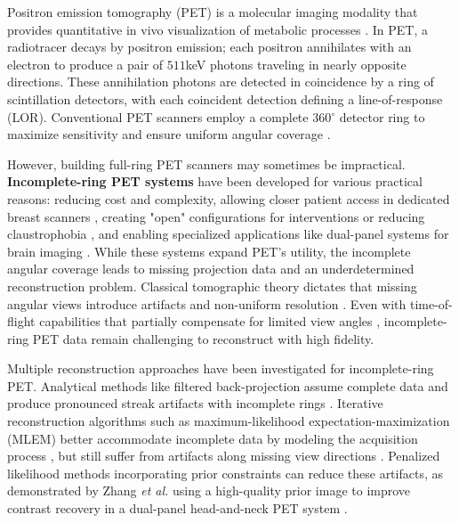 \documentclass[
reprint,
superscriptaddress,
nofootinbib,
amsmath,amssymb,
aps,
prd,
]{revtex4-2}
\begin{document}
Positron emission tomography (PET) is a molecular imaging modality that provides quantitative in vivo visualization of metabolic processes  \cite{townsend2004}. In PET, a radiotracer decays by positron emission; each positron annihilates with an electron to produce a pair of $511$keV photons traveling in nearly opposite directions. These annihilation photons are detected in coincidence by a ring of scintillation detectors, with each coincident detection defining a line-of-response (LOR). Conventional PET scanners employ a complete 360$^\circ$ detector ring to maximize sensitivity and ensure uniform angular coverage  \cite{townsend2004}.

However, building full-ring PET scanners may sometimes be impractical. \textbf{Incomplete-ring PET systems} have been developed for various practical reasons: reducing cost and complexity, allowing closer patient access in dedicated breast scanners  \cite{surti2008}, creating "open" configurations for interventions or reducing claustrophobia  \cite{tashima2012, krishnamoorthy2021}, and enabling specialized applications like dual-panel systems for brain imaging  \cite{zhang2020}. While these systems expand PET's utility, the incomplete angular coverage leads to missing projection data and an underdetermined reconstruction problem. Classical tomographic theory dictates that missing angular views introduce artifacts and non-uniform resolution  \cite{kak1988, surti2008}. Even with time-of-flight capabilities that partially compensate for limited view angles  \cite{surti2008, krishnamoorthy2021}, incomplete-ring PET data remain challenging to reconstruct with high fidelity.

Multiple reconstruction approaches have been investigated for incomplete-ring PET. Analytical methods like filtered back-projection assume complete data and produce pronounced streak artifacts with incomplete rings  \cite{kak1988}. Iterative reconstruction algorithms such as maximum-likelihood expectation-maximization (MLEM) better accommodate incomplete data by modeling the acquisition process  \cite{qi2006}, but still suffer from artifacts along missing view directions  \cite{zhang2020}. Penalized likelihood methods incorporating prior constraints can reduce these artifacts, as demonstrated by Zhang \textit{et al.} using a high-quality prior image to improve contrast recovery in a dual-panel head-and-neck PET system  \cite{zhang2020}.
\end{document}
